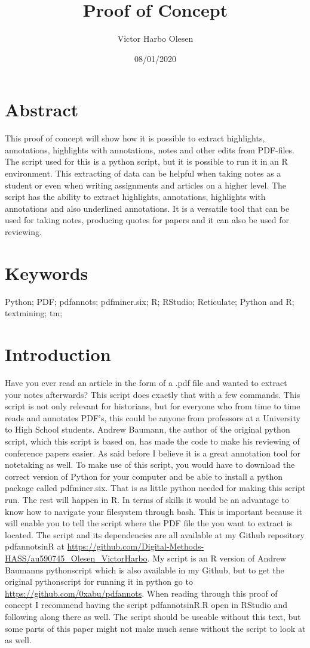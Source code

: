 \documentclass{article}
\title{Proof of Concept}
\author{Victor Harbo Olesen}
\date{08/01/2020}
\begin{document}
\maketitle

\section{Abstract}
This proof of concept will show how it is possible to extract highlights, annotations, highlights with annotations, notes and other edits from PDF-files. The script used for this is a python script, but it is possible to run it in an R environment. This extracting of data can be helpful when taking notes as a student or even when writing assignments and articles on a higher level. The script has the ability to extract highlights, annotations, highlights with annotations and also underlined annotations. It is a versatile tool that can be used for taking notes, producing quotes for papers and it can also be used for reviewing.
\section{Keywords}
Python; PDF; pdfannots; pdfminer.six; R; RStudio; Reticulate; Python and R; textmining; tm; 
\section{Introduction}
Have you ever read an article in the form of a .pdf file and wanted to extract your notes afterwards?
This script does exactly that with a few commands. This script is not only relevant for historians, but for everyone who from time to time reads and annotates PDF’s, this could be anyone from professors at a University to High School students. Andrew Baumann, the author of the original python script, which this script is based on, has made the code to make his reviewing of conference papers easier. As said before I believe it is a great annotation tool for notetaking as well. \newline
To make use of this script, you would have to download the correct version of Python for your computer and be able to install a python package called pdfminer.six. That is as little python needed for making this script run. The rest will happen in R. In terms of skills it would be an advantage to know how to navigate your filesystem through bash. This is important because it will enable you to tell the script where the PDF file the you want to extract is located. \newline
The script and its dependencies are all available at my Github repository pdfannots\textunderscore in\textunderscore R at \url{https://github.com/Digital-Methods-HASS/au590745_Olesen_VictorHarbo}. My script is an R version of Andrew Baumanns pythonscript which is also available in my Github, but to get the original pythonscript for running it in python go to \url{https://github.com/0xabu/pdfannots}. When reading through this proof of concept I recommend having the script pdfannots\textunderscore inR.R open in RStudio and following along there as well. The script should be useable without this text, but some parts of this paper might not make much sense without the script to look at as well. 
\end{document}
